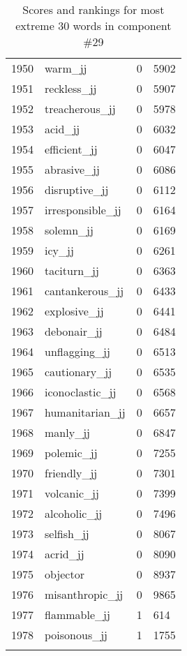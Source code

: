 \begin{longtable}[!htbp]{| rlr@{.}l |}
    1950 & warm\_jj & 0 & 5902 \\
    1951 & reckless\_jj & 0 & 5907 \\
    1952 & treacherous\_jj & 0 & 5978 \\
    1953 & acid\_jj & 0 & 6032 \\
    1954 & efficient\_jj & 0 & 6047 \\
    1955 & abrasive\_jj & 0 & 6086 \\
    1956 & disruptive\_jj & 0 & 6112 \\
    1957 & irresponsible\_jj & 0 & 6164 \\
    1958 & solemn\_jj & 0 & 6169 \\
    1959 & icy\_jj & 0 & 6261 \\
    1960 & taciturn\_jj & 0 & 6363 \\
    1961 & cantankerous\_jj & 0 & 6433 \\
    1962 & explosive\_jj & 0 & 6441 \\
    1963 & debonair\_jj & 0 & 6484 \\
    1964 & unflagging\_jj & 0 & 6513 \\
    1965 & cautionary\_jj & 0 & 6535 \\
    1966 & iconoclastic\_jj & 0 & 6568 \\
    1967 & humanitarian\_jj & 0 & 6657 \\
    1968 & manly\_jj & 0 & 6847 \\
    1969 & polemic\_jj & 0 & 7255 \\
    1970 & friendly\_jj & 0 & 7301 \\
    1971 & volcanic\_jj & 0 & 7399 \\
    1972 & alcoholic\_jj & 0 & 7496 \\
    1973 & selfish\_jj & 0 & 8067 \\
    1974 & acrid\_jj & 0 & 8090 \\
    1975 & objector & 0 & 8937 \\
    1976 & misanthropic\_jj & 0 & 9865 \\
    1977 & flammable\_jj & 1 & 614 \\
    1978 & poisonous\_jj & 1 & 1755 \\
    \hline
    \caption{Scores and rankings for most extreme 30 words in component \#29} \\
\end{longtable}

